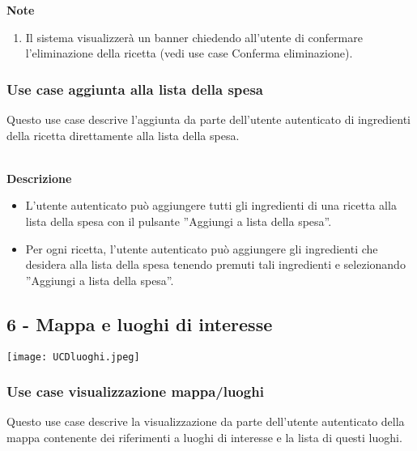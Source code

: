 \documentclass[a4paper,12pt]{article}
\begin{document}
\textbf{Note}
\begin{enumerate} \setlength\itemsep{0.01em}
\item Il sistema visualizzerà un banner chiedendo all'utente di confermare l'eliminazione della ricetta  (vedi use case Conferma eliminazione).
\end{enumerate}




\subsubsection*{Use case aggiunta alla lista della spesa}

 Questo use case descrive l'aggiunta da parte dell'utente autenticato di ingredienti della ricetta direttamente alla lista della spesa.
 
\textbf{\\Descrizione}
\begin{itemize} \setlength\itemsep{0.01em}
\item L'utente autenticato può aggiungere tutti gli ingredienti di una ricetta alla lista della spesa con il pulsante ''Aggiungi a lista della spesa''.
\item Per ogni ricetta, l'utente autenticato può aggiungere gli ingredienti che desidera alla lista della spesa tenendo premuti tali ingredienti e selezionando ''Aggiungi a lista della spesa''.
\end{itemize}







\subsection*{6 - Mappa e luoghi di interesse }

\begin{center}
  \texttt{[image: UCDluoghi.jpeg]}
\end{center}



\subsubsection*{Use case visualizzazione mappa/luoghi}

Questo use case descrive la visualizzazione da parte dell'utente autenticato della mappa contenente dei riferimenti a luoghi di interesse e la lista di questi luoghi.
\end{document}
